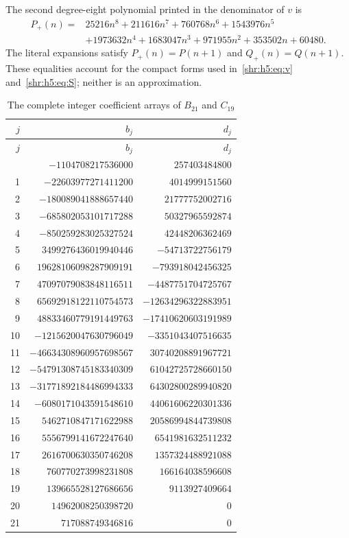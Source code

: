 \documentclass[11pt,letterpaper]{article}
\numberwithin{equation}{section}
\theoremstyle{definition}
\newcommand{\1}{\mathbf 1}
\begin{document}
The second degree-eight polynomial printed in the denominator of $v$ is
\begin{align}
 P_+(n)={}&25216n^8+211616n^7+760768n^6+1543976n^5\\
         &+1973632n^4+1683047n^3+971955n^2+353502n+60480.
 \label{shr:h5:eq:Pplus}
\end{align}
The literal expansions satisfy $P_+(n)=P(n+1)$ and
$Q_+(n)=Q(n+1)$. These equalities account for the compact forms used
in~\eqref{shr:h5:eq:v} and~\eqref{shr:h5:eq:S}; neither is an approximation.

\begin{center}
\small
\begin{longtable}{@{}r r r@{}}
\caption{The complete integer coefficient arrays of $B_{21}$ and $C_{19}$}\label{shr:h5:tab:literal-arrays}\\
\toprule
$j$&$b_j$&$d_j$\\\midrule\endfirsthead
\toprule $j$&$b_j$&$d_j$\\\midrule\endhead
\bottomrule\endfoot
0&$-1104708217536000$&$257403484800$\\
1&$-22603977271411200$&$4014999151560$\\
2&$-180089041888657440$&$21777752002716$\\
3&$-685802053101717288$&$50327965592874$\\
4&$-850259283025327524$&$42448206362469$\\
5&$3499276436019940446$&$-54713722756179$\\
6&$19628106098287909191$&$-793918042456325$\\
7&$47097079083848116511$&$-4487751704725767$\\
8&$65692918122110754573$&$-12634296322883951$\\
9&$48833460779191449763$&$-17410620603191989$\\
10&$-1215620047630796049$&$-3351043407516635$\\
11&$-46634308960957698567$&$30740208891967721$\\
12&$-54791308745183340309$&$61042725728660150$\\
13&$-31771892184486994333$&$64302800289940820$\\
14&$-6080171043591548610$&$44061606220301336$\\
15&$5462710847171622988$&$20586994844739808$\\
16&$5556799141672247640$&$6541981632511232$\\
17&$2616700630350746208$&$1357324488921088$\\
18&$760770273998231808$&$166164038596608$\\
19&$139665528127686656$&$9113927409664$\\
20&$14962008250398720$&$0$\\
21&$717088749346816$&$0$\\
\end{longtable}
\end{center}
\end{document}
